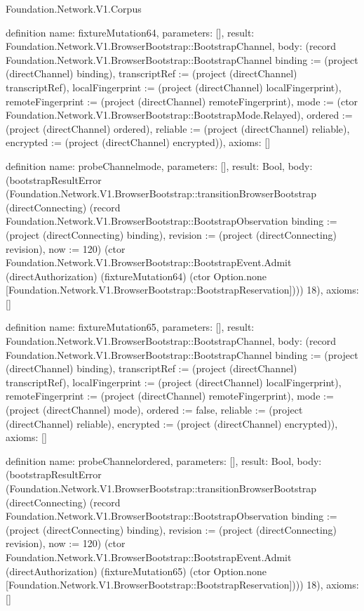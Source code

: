 \begin{lexlean}{Foundation.Network.V1.Corpus}
\begin{semanticmodule}
definition{
  name: fixtureMutation64,
  parameters: [],
  result: Foundation.Network.V1.BrowserBootstrap::BootstrapChannel,
  body: (record Foundation.Network.V1.BrowserBootstrap::BootstrapChannel {binding := (project (directChannel) binding), transcriptRef := (project (directChannel) transcriptRef), localFingerprint := (project (directChannel) localFingerprint), remoteFingerprint := (project (directChannel) remoteFingerprint), mode := (ctor Foundation.Network.V1.BrowserBootstrap::BootstrapMode.Relayed), ordered := (project (directChannel) ordered), reliable := (project (directChannel) reliable), encrypted := (project (directChannel) encrypted)}),
  axioms: []
}

definition{
  name: probeChannelmode,
  parameters: [],
  result: Bool,
  body: (bootstrapResultError (Foundation.Network.V1.BrowserBootstrap::transitionBrowserBootstrap (directConnecting) (record Foundation.Network.V1.BrowserBootstrap::BootstrapObservation {binding := (project (directConnecting) binding), revision := (project (directConnecting) revision), now := 120}) (ctor Foundation.Network.V1.BrowserBootstrap::BootstrapEvent.Admit (directAuthorization) (fixtureMutation64) (ctor Option.none [Foundation.Network.V1.BrowserBootstrap::BootstrapReservation]))) 18),
  axioms: []
}

definition{
  name: fixtureMutation65,
  parameters: [],
  result: Foundation.Network.V1.BrowserBootstrap::BootstrapChannel,
  body: (record Foundation.Network.V1.BrowserBootstrap::BootstrapChannel {binding := (project (directChannel) binding), transcriptRef := (project (directChannel) transcriptRef), localFingerprint := (project (directChannel) localFingerprint), remoteFingerprint := (project (directChannel) remoteFingerprint), mode := (project (directChannel) mode), ordered := false, reliable := (project (directChannel) reliable), encrypted := (project (directChannel) encrypted)}),
  axioms: []
}

definition{
  name: probeChannelordered,
  parameters: [],
  result: Bool,
  body: (bootstrapResultError (Foundation.Network.V1.BrowserBootstrap::transitionBrowserBootstrap (directConnecting) (record Foundation.Network.V1.BrowserBootstrap::BootstrapObservation {binding := (project (directConnecting) binding), revision := (project (directConnecting) revision), now := 120}) (ctor Foundation.Network.V1.BrowserBootstrap::BootstrapEvent.Admit (directAuthorization) (fixtureMutation65) (ctor Option.none [Foundation.Network.V1.BrowserBootstrap::BootstrapReservation]))) 18),
  axioms: []
}


\end{semanticmodule}
\end{lexlean}
